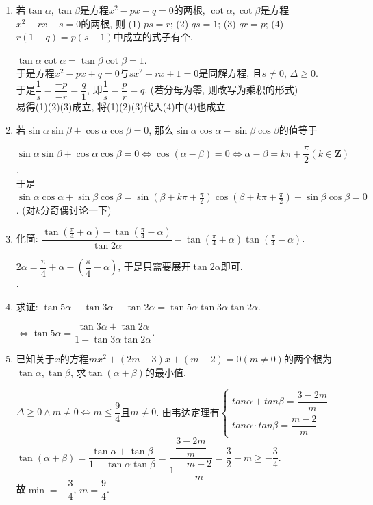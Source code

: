 \begin{enumerate}
\item 若$\tan\alpha,\tan\beta$是方程$x^2-px+q=0$的两根, $\cot\alpha,\cot\beta$是方程$x^2-rx+s=0$的两根, 
则 (1) $ps=r$; (2) $qs=1$; (3) $qr=p$; (4) $r\left(1-q\right)=p\left(s-1\right)$中成立的式子有个.
\begin{jieda}
$\tan\alpha\cot\alpha=\tan\beta\cot\beta=1$. \\
于是方程$x^2-px+q=0$与$sx^2-rx+1=0$是同解方程, 且$s\neq 0$, $\Delta\geq 0$. \\
于是$\dfrac{1}{s}=\dfrac{-p}{-r}=\dfrac{q}{1}$, 即$\dfrac{1}{s}=\dfrac{p}{r}=q$. (若分母为零, 则改写为乘积的形式)\\
易得(1)(2)(3)成立, 将(1)(2)(3)代入(4)中(4)也成立. 
\end{jieda}
\item 若$\sin\alpha\sin\beta+\cos\alpha\cos\beta=0$, 那么$\sin\alpha\cos\alpha+\sin\beta\cos\beta$的值等于
\begin{jieda}
$\sin\alpha\sin\beta+\cos\alpha\cos\beta=0\iff\cos\left(\alpha-\beta\right)=0\iff\alpha-\beta=k\pi+\dfrac{\pi}{2}(k \in \mathbf{Z})$. \\
于是$\sin\alpha\cos\alpha+\sin\beta\cos\beta = \sin\left(\beta+k\pi+\frac{\pi}{2}\right)\cos\left(\beta+k\pi+\frac{\pi}{2}\right)+\sin\beta\cos\beta=0$. (对$k$分奇偶讨论一下)
\end{jieda}
\item 化简: $\dfrac{\tan\left(\frac{\pi}{4}+\alpha\right)-\tan\left(\frac{\pi}{4}-\alpha\right)}{\tan2\alpha}-\tan\left(\frac{\pi}{4}+\alpha\right)\tan\left(\frac{\pi}{4}-\alpha\right)$. 
\begin{jieda}
$2\alpha=\dfrac{\pi}{4}+\alpha-\left(\dfrac{\pi}{4}-\alpha\right)$, 于是只需要展开$\tan2\alpha$即可. \\
. 
\end{jieda}
\item 求证: $\tan5\alpha-\tan3\alpha-\tan2\alpha=\tan5\alpha\tan3\alpha\tan2\alpha$. 
\begin{jieda}
$\iff \tan5\alpha=\dfrac{\tan3\alpha+\tan2\alpha}{1-\tan3\alpha\tan2\alpha}$.
\end{jieda}


\item 已知关于$x$的方程$mx^2+\left(2m-3\right)x+\left(m-2\right)=0\left(m\neq 0\right)$的两个根为$\tan\alpha,\tan\beta$, 求$\tan\left(\alpha+\beta\right)$的最小值.
\begin{jieda}
$\Delta\geq 0\land m\neq 0\iff m\leq\dfrac{9}{4}$且$ m\neq 0$. 由韦达定理有$\left \{ \begin{array}{l}
         tan\alpha + tan\beta = \dfrac{3-2m}{m}  \\
         tan\alpha \cdot tan\beta = \dfrac{m-2}{m}
        \end{array}\right.$ \\
$\tan\left(\alpha+\beta\right)=\dfrac{\tan\alpha+\tan\beta}{1-\tan\alpha\tan\beta}=\dfrac{\dfrac{3-2m}{m}}{1-\dfrac{m-2}{m}} = \dfrac{3}{2}-m\geq-\dfrac{3}{4}$. \\
故$\min=-\dfrac{3}{4}$, $m=\dfrac{9}{4}$. 
\end{jieda}


\end{enumerate}
